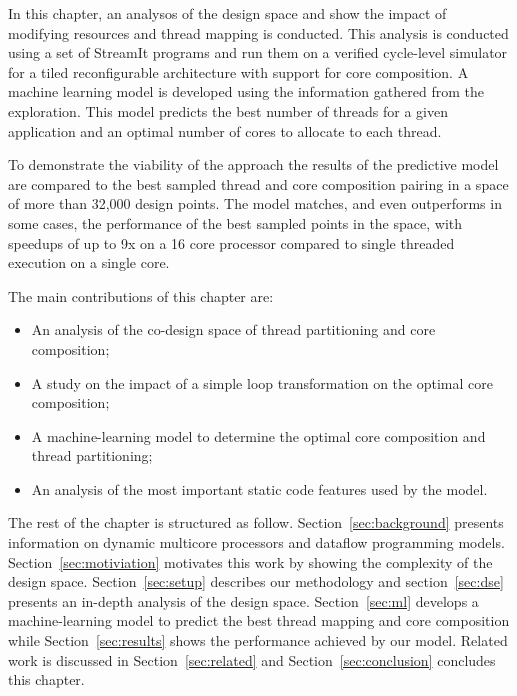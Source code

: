 In this chapter, an analysos of the design space and show the impact of modifying resources and thread mapping is conducted.
This analysis is conducted using a set of StreamIt programs and run them on a verified cycle-level simulator for a tiled reconfigurable architecture with support for core composition.
A machine learning model is developed using the information gathered from the exploration.
This model predicts the best number of threads for a given application and an optimal number of cores to allocate to each thread.

To demonstrate the viability of the approach the results of the predictive model are compared to the best sampled thread and core composition pairing in a space of more than 32,000 design points.
The model matches, and even outperforms in some cases, the performance of the best sampled points in the space, with speedups of up to 9x on a 16 core processor compared to single threaded execution on a single core. 

The main contributions of this chapter are:
\vspace{-1mm}
\begin{itemize}
\item An analysis of the co-design space of thread partitioning and core composition;
\item A study on the impact of a simple loop transformation on the optimal core composition;
\item A machine-learning model to determine the optimal core composition and thread partitioning;
\item An analysis of the most important static code features used by the model.
\end{itemize}


The rest of the chapter is structured as follow.
Section~\ref{sec:background} presents information on dynamic multicore processors and dataflow programming models.
Section~\ref{sec:motiviation} motivates this work by showing the complexity of the design space.
Section~\ref{sec:setup} describes our methodology and section~\ref{sec:dse} presents an in-depth analysis of the design space.
Section~\ref{sec:ml} develops a machine-learning model to predict the best thread mapping and core composition while Section~\ref{sec:results} shows the performance achieved by our model.
Related work is discussed in Section~\ref{sec:related} and Section~\ref{sec:conclusion} concludes this chapter.
